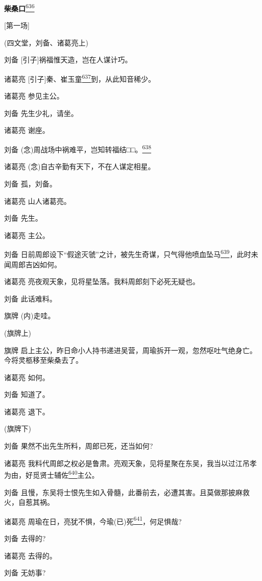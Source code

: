 \newpage
{} %
\textbf{柴桑口}\protect\hyperlink{fn636}{\textsuperscript{636}}

{[}第一场{]}

(四文堂，刘备、诸葛亮上)

刘备 {[}引子{]}祸福惟天造，岂在人谋计巧。

诸葛亮
{[}引子{]}秦、崔玉童\protect\hyperlink{fn637}{\textsuperscript{637}}到，从此知音稀少。

诸葛亮 参见主公。

刘备 先生少礼，请坐。

诸葛亮 谢座。

刘备
(念)周战场中祸难平，岂知转福结□□。\protect\hyperlink{fn638}{\textsuperscript{638}}

诸葛亮 (念)自古辛勤有天下，不在人谋定相星。

刘备 孤，刘备。

诸葛亮 山人诸葛亮。

刘备 先生。

诸葛亮 主公。

刘备
日前周郎设下``假途灭虢''之计，被先生奇谋，只气得他喷血坠马\protect\hyperlink{fn639}{\textsuperscript{639}}，此时未闻周郎吉凶如何。

诸葛亮 亮夜观天象，见将星坠落。我料周郎刻下必死无疑也。

刘备 此话难料。

旗牌 (内)走哇。

(旗牌上)

旗牌
启上主公，昨日命小人持书递进吴营，周瑜拆开一观，忽然呕吐气绝身亡。今将灵柩移至柴桑去了。

诸葛亮 如何。

刘备 知道了。

诸葛亮 退下。

(旗牌下)

刘备 果然不出先生所料，周郎已死，还当如何?

诸葛亮
我料代周郎之权必是鲁肃。亮观天象，见将星聚在东吴，我当以过江吊孝为由，好觅贤士辅佐\protect\hyperlink{fn640}{\textsuperscript{640}}主公。

刘备
且慢，东吴将士恨先生如入骨髓，此番前去，必遭其害。且莫做那披麻救火，自惹其祸。

诸葛亮
周瑜在日，亮犹不惧，今瑜(已)死\protect\hyperlink{fn641}{\textsuperscript{641}}，何足惧哉?

刘备 去得的?

诸葛亮 去得的。

刘备 无妨事?

